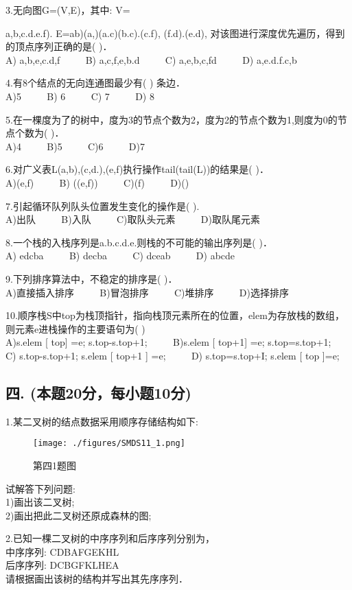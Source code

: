 3.无向图G=(V,E)，其中: V={a,b,c.d.e.f). E={ab)(a,)(a.c)(b.c).(c.f), (f.d).(e.d)}, 对该图进行深度优先遍历，得到的顶点序列正确的是( )． \\
A) a,b,e,c.d,f $\qquad$ B) a,c,f,e,b.d $\qquad$ C) a,e,b,c,fd $\qquad$ D) a,e.d.f.c,b

4.有8个结点的无向连通图最少有( ) 条边． \\
A)5 $\qquad$ B) 6 $\qquad$ C) 7 $\qquad$ D) 8

5.在一棵度为了的树中，度为3的节点个数为2，度为2的节点个数为1,则度为0的节点个数为(  )． \\
A)4 $\qquad$ B)5 $\qquad$ C)6 $\qquad$ D)7

6.对广义表L(a,b),(c,d.),(e,f)执行操作tail(tail(L))的结果是(  )． \\
A)(e,f) $\qquad$ B) ((e,f)) $\qquad$ C)(f) $\qquad$ D)()

7.引起循环队列队头位置发生变化的操作是( ). \\
A)出队 $\qquad$ B)入队 $\qquad$ C)取队头元素 $\qquad$ D)取队尾元素

8.一个栈的入栈序列是a.b.c.d.e.则栈的不可能的输出序列是( )． \\
A) edcba $\qquad$ B) decba $\qquad$ C) dceab $\qquad$ D) abcde

9.下列排序算法中，不稳定的排序是(  )． \\
A)直接插入排序 $\qquad$ B)冒泡排序 $\qquad$ C)堆排序 $\qquad$ D)选择排序

10.顺序栈S中top为栈顶指针，指向栈顶元素所在的位置，elem为存放栈的数组，则元素e进栈操作的主要语句为(  ) \\
A)s.elem [ top] =e; s.top-s.top+1; $\qquad$ B)s.elem [ top+1] =e; s.top=s.top+1; \\
C) s.top-s.top+1; s.elem [ top+1 ] =e; $\qquad$ D) s.top=s.top+I; s.elem [ top ]=e;

\subsection{四. (本题20分，每小题10分)}
1.某二叉树的结点数据采用顺序存储结构如下: \\
\begin{figure}[ht]
\centering
\texttt{[image: ./figures/SMDS11\_1.png]}
\caption{第四1题图} \label{SMDS11_fig1}
\end{figure}
试解答下列问题: \\
1)画出该二叉树; \\
2)画出把此二叉树还原成森林的图;

2.已知一棵二叉树的中序序列和后序序列分别为， \\
中序序列: CDBAFGEKHL \\
后序序列: DCBGFKLHEA \\
请根据画出该树的结构并写出其先序序列．

}
